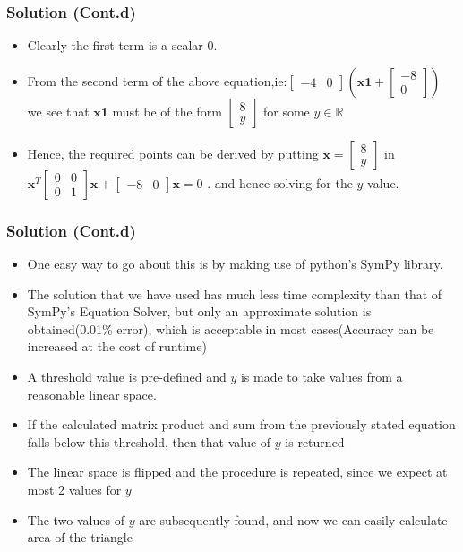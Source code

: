 \documentclass{beamer}
\begin{document}
\begin{frame}
\frametitle{Solution (Cont.d)}
\begin{itemize}	
	\item<1-> Clearly the first term is a scalar $0$.
	\item<2-> From the second term of the above equation,ie:\newline$\begin{bmatrix} -4 & 0
	\end{bmatrix} (\mathbf{x1} +\begin{bmatrix} -8 \\ 0
	\end{bmatrix} )$ we see that $\mathbf{x1}$ must be of the form $\begin{bmatrix} 8 \\ y
	\end{bmatrix}$ for some $y \in$$ \mathbb{R}$
	\item<3-> Hence, the required points can be derived by putting $\mathbf{x} =\begin{bmatrix} 8 \\ y
	\end{bmatrix} $ in $\mathbf{x}^T \begin{bmatrix} 0 & 0 \\0 & 1
	\end{bmatrix} \mathbf{x} + \begin{bmatrix} -8 & 0
	\end{bmatrix} \mathbf{x} = 0$ \newline.
	\newline and hence solving for the $y$ value.
\end{itemize}
\end{frame}
\begin{frame}
\frametitle{Solution (Cont.d)}
\begin{itemize}	
	\item<1-> One easy way to go about this is by making use of python's SymPy library.
	\item<2-> The solution that we have used has much less time complexity than that of SymPy's Equation Solver, but only an approximate solution is obtained(0.01\% error), which is acceptable in most cases(Accuracy can be increased at the cost of runtime)
	\item<3-> A threshold value is pre-defined and $y$ is made to take values from a reasonable linear space.
	\item<4-> If the calculated matrix product and sum from the previously stated equation falls below this threshold, then that value of $y$ is returned
	\item<5-> The linear space is flipped and the procedure is repeated, since we expect at most 2 values for $y$
	\item<6-> The two values of $y$ are subsequently found, and now we can easily calculate area of the triangle
\end{itemize}
\end{frame}
\end{document}
